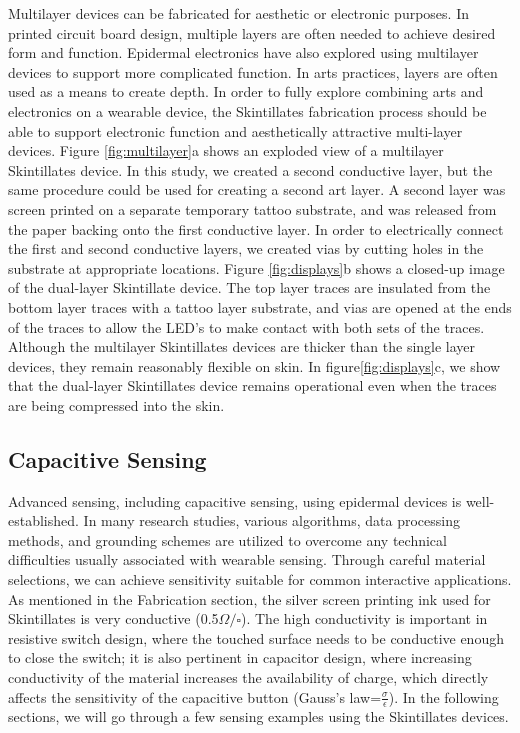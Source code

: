 \documentclass{sigchi}
\begin{document}
Multilayer devices can be fabricated for aesthetic or electronic purposes. In printed circuit board design, multiple layers are often needed to achieve desired form and function. Epidermal electronics have also explored using multilayer devices to support more complicated function. In arts practices, layers are often used as a means to create depth. In order to fully explore combining arts and electronics on a wearable device, the Skintillates fabrication process should be able to support electronic function and aesthetically attractive multi-layer devices. Figure \ref{fig:multilayer}a shows an exploded view of a multilayer Skintillates device. In this study, we created a second conductive layer, but the same procedure could be used for creating a second art layer. A second layer was screen printed on a separate temporary tattoo substrate, and was released from the paper backing onto the first conductive layer. In order to electrically connect the first and second conductive layers, we created vias by cutting holes in the substrate at appropriate locations. Figure \ref{fig:displays}b shows a closed-up image of the dual-layer Skintillate device. The top layer traces are insulated from the bottom layer traces with a tattoo layer substrate, and vias are opened at the ends of the traces to allow the LED's to make contact with both sets of the traces. Although the multilayer Skintillates devices are thicker than the single layer devices, they remain reasonably flexible on skin. In figure\ref{fig:displays}c, we show that the dual-layer Skintillates device remains operational even when the traces are being compressed into the skin. 
\subsection{Capacitive Sensing}
Advanced sensing, including capacitive sensing, using epidermal devices is well-established\cite{Jeong:2013km,Frutiger:2015fm,Mannsfeld:2010is}. In many research studies, various algorithms, data processing methods, and grounding schemes are utilized to overcome any technical difficulties usually associated with wearable sensing.  Through careful material selections, we can achieve sensitivity suitable for common interactive applications. As mentioned in the Fabrication section, the silver screen printing ink used for Skintillates is very conductive (0.5$\Omega/\square$). 
 The high conductivity is important in resistive switch design, where the touched surface needs to be conductive enough to close the switch; it is also pertinent in capacitor design, where increasing conductivity of the material increases the availability of charge, which directly affects the sensitivity of the capacitive button (Gauss’s law=$\frac{\sigma}{\epsilon}$). In the following sections, we will go through a few sensing examples using the Skintillates devices. 
\end{document}
